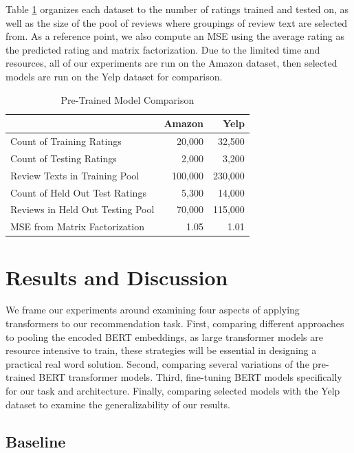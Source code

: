 \documentclass[11pt,a4paper]{article}
\begin{document}
Table \ref{table:4} organizes each dataset to the number of ratings trained and tested on, as well as the size of the pool of reviews where groupings of review text are selected from.  As a reference point, we also compute an MSE using the average rating as the predicted rating and matrix factorization. Due to the limited time and resources, all of our experiments are run on the Amazon dataset, then selected models are run on the Yelp dataset for comparison.

\begin{table}[H]
\centering
\small
\begin{tabular}{@{} l *2r @{}}
\cline{2-3}
\multicolumn{1}{l}{\textbf{}} & \textbf{Amazon} & \textbf{Yelp}  \\ 
\midrule
 Count of Training Ratings & 20,000 & 32,500 \\ 
 Count of Testing Ratings & 2,000 & 3,200 \\
 Review Texts in Training Pool & 100,000 & 230,000 \\
 Count of Held Out Test Ratings & 5,300 & 14,000 \\
 Reviews in Held Out Testing Pool & 70,000 & 115,000 \\
 MSE from Matrix Factorization & 1.05 & 1.01 \\
\bottomrule
\end{tabular}
\caption{Pre-Trained Model Comparison}
\label{table:4}
\end{table}

\section{Results and Discussion}

We frame our experiments around examining four aspects of applying transformers to our recommendation task.  First, comparing different approaches to pooling the encoded BERT embeddings, as large transformer models are resource intensive to train, these strategies will be essential in designing a practical real word solution.  Second, comparing several variations of the pre-trained BERT transformer models. Third, fine-tuning BERT models specifically for our task and architecture.  Finally, comparing selected models with the Yelp dataset to examine the generalizability of our results.

\subsection{Baseline}
\end{document}
